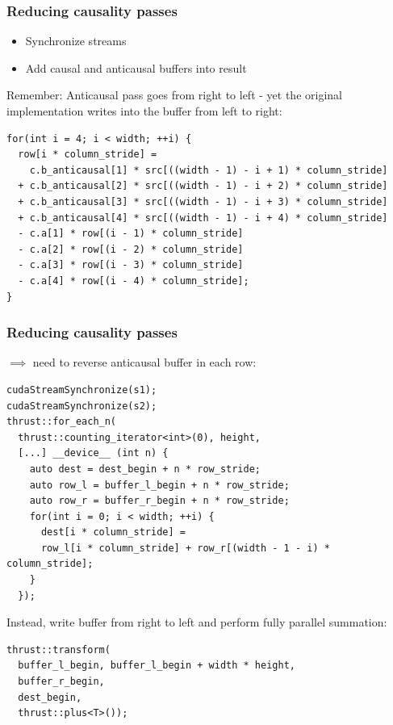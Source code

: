 \documentclass{beamer}
\begin{document}
\begin{frame}[fragile]
  \frametitle{Reducing causality passes}
  \begin{itemize}
    \item Synchronize streams
    \item Add causal and anticausal buffers into result
  \end{itemize}
  Remember: Anticausal pass goes from right to left - yet the original
  implementation writes into the buffer from left to right:
  \begin{lstlisting}[basicstyle=\tiny]
for(int i = 4; i < width; ++i) {
  row[i * column_stride] =
    c.b_anticausal[1] * src[((width - 1) - i + 1) * column_stride]
  + c.b_anticausal[2] * src[((width - 1) - i + 2) * column_stride]
  + c.b_anticausal[3] * src[((width - 1) - i + 3) * column_stride]
  + c.b_anticausal[4] * src[((width - 1) - i + 4) * column_stride]
  - c.a[1] * row[(i - 1) * column_stride]
  - c.a[2] * row[(i - 2) * column_stride]
  - c.a[3] * row[(i - 3) * column_stride]
  - c.a[4] * row[(i - 4) * column_stride];
}
  \end{lstlisting}
\end{frame}

\begin{frame}[fragile]
  \frametitle{Reducing causality passes}
  $\implies$ need to reverse anticausal buffer in each row:
  \begin{lstlisting}[basicstyle=\tiny]
cudaStreamSynchronize(s1);
cudaStreamSynchronize(s2);
thrust::for_each_n(
  thrust::counting_iterator<int>(0), height,
  [...] __device__ (int n) {
    auto dest = dest_begin + n * row_stride;
    auto row_l = buffer_l_begin + n * row_stride;
    auto row_r = buffer_r_begin + n * row_stride;
    for(int i = 0; i < width; ++i) {
      dest[i * column_stride] =
      row_l[i * column_stride] + row_r[(width - 1 - i) * column_stride];
    }
  });
  \end{lstlisting}
  Instead, write buffer from right to left and perform fully parallel
  summation:
  \begin{lstlisting}[basicstyle=\tiny]
thrust::transform(
  buffer_l_begin, buffer_l_begin + width * height,
  buffer_r_begin,
  dest_begin,
  thrust::plus<T>());
  \end{lstlisting}
\end{frame}
\end{document}
